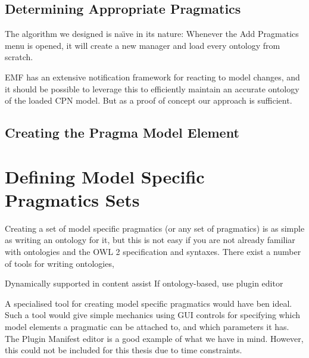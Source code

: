 	\subsection{Determining Appropriate Pragmatics}
	
	The algorithm we designed is na\"{\i}ve in its nature: Whenever the Add
	Pragmatics menu is opened, it will create a new manager and load every ontology
	from scratch. 
	
	EMF has an extensive notification framework for reacting to model changes, and
	it should be possible to leverage this to efficiently maintain an accurate
	ontology of the loaded CPN model. But as a proof of concept our approach is
	sufficient.
	
	\subsection{Creating the Pragma Model Element}
	
\section{Defining Model Specific Pragmatics Sets}
Creating a set of model specific pragmatics (or any set of pragmatics) is as
simple as writing an ontology for it, but this is not easy if you are not
already familiar with ontologies and the OWL 2 specification and syntaxes. There exist
a number of tools for writing ontologies, 

Dynamically supported in content assist 
If ontology-based, use plugin editor

A specialised tool for creating model specific pragmatics would have ben ideal.
Such a tool would give simple mechanics using GUI controls for specifying which
model elements a pragmatic can be attached to, and which parameters it has. The
Plugin Manifest editor is a good example of what we have in mind. However, this
could not be included for this thesis due to time constraints.
	
